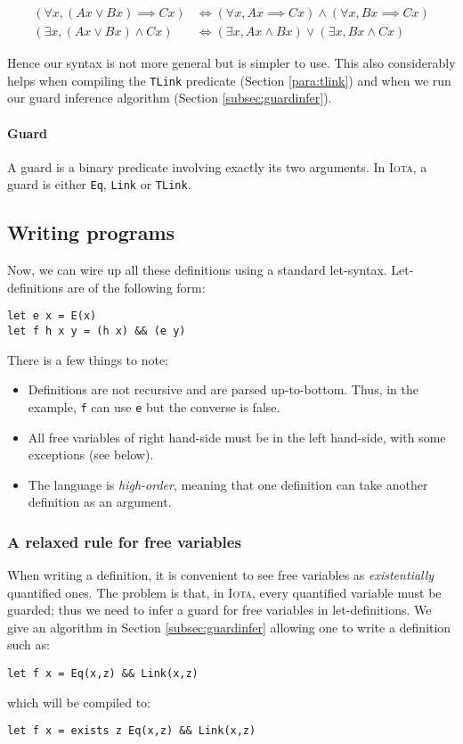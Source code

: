 \documentclass[10pt,a4paper]{article}
\newcommand\Iota{\textsc{Iota}}
\newcommand{\ocaml}{\texttt}
\begin{document}
\begin{align*}
  (\forall x, (A x \lor B x) \implies C x) &\iff (\forall x, A x \implies C x) \land (\forall x, B x \implies C x)\\
  (\exists x, (A x \lor B x ) \land C x) &\iff (\exists x, A x \land B x) \lor (\exists x, B x \land C x)
\end{align*}

Hence our syntax is not more general but is simpler to use. This also considerably helps when compiling the \ocaml{TLink} predicate (Section \ref{para:tlink}) and when we run our guard inference algorithm (Section \ref{subsec:guardinfer}).

\paragraph{Guard}
A guard is a binary predicate involving exactly its two arguments. In \Iota{}, a guard is either \ocaml{Eq}, \ocaml{Link} or \ocaml{TLink}.

\subsection{Writing programs}
Now, we can wire up all these definitions using a standard let-syntax. Let-definitions are of the following form:
\begin{verbatim}
let e x = E(x)
let f h x y = (h x) && (e y)
\end{verbatim}
There is a few things to note:
\begin{itemize}
\item Definitions are not recursive and are parsed up-to-bottom. Thus, in the example, \ocaml{f} can use \ocaml{e} but the converse is false.
\item All free variables of right hand-side must be in the left hand-side, with some exceptions (see below).
\item The language is \emph{high-order}, meaning that one definition can take another definition as an argument.
\end{itemize}

\subsubsection{A relaxed rule for free variables}
When writing a definition, it is convenient to see free variables as \emph{existentially} quantified ones. The problem is that, in \Iota{}, every quantified variable must be guarded; thus we need to infer a guard for free variables in let-definitions. We give an algorithm in Section \ref{subsec:guardinfer} allowing one to write a definition such as:
\begin{verbatim}
let f x = Eq(x,z) && Link(x,z)
\end{verbatim}
which will be compiled to:
\begin{verbatim}
let f x = exists z Eq(x,z) && Link(x,z)
\end{verbatim}
\end{document}
